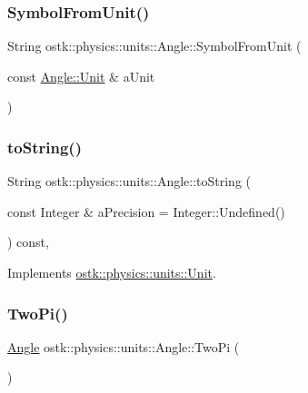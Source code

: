 \subsubsection{\texorpdfstring{Symbol\+From\+Unit()}{SymbolFromUnit()}}
{\footnotesize\ttfamily String ostk\+::physics\+::units\+::\+Angle\+::\+Symbol\+From\+Unit (\begin{DoxyParamCaption}\item[{const \hyperlink{classostk_1_1physics_1_1units_1_1_angle_aea1f8018b1d378b9dee56959d8eb9def}{Angle\+::\+Unit} \&}]{a\+Unit }\end{DoxyParamCaption})\hspace{0.3cm}{\ttfamily [static]}}

\mbox{\label{classostk_1_1physics_1_1units_1_1_angle_a7403146e01d293dfdd30130f9a9f0f2f}} 
\subsubsection{\texorpdfstring{to\+String()}{toString()}}
{\footnotesize\ttfamily String ostk\+::physics\+::units\+::\+Angle\+::to\+String (\begin{DoxyParamCaption}\item[{const Integer \&}]{a\+Precision = {\ttfamily Integer\+:\+:Undefined()} }\end{DoxyParamCaption}) const\hspace{0.3cm}{\ttfamily [override]}, {\ttfamily [virtual]}}



Implements \hyperlink{classostk_1_1physics_1_1units_1_1_unit_a8162b4eb8221c7577af16ab8b399d07e}{ostk\+::physics\+::units\+::\+Unit}.

\mbox{\label{classostk_1_1physics_1_1units_1_1_angle_a2a78cc568975aa82e2011e24cd015f72}} 
\subsubsection{\texorpdfstring{Two\+Pi()}{TwoPi()}}
{\footnotesize\ttfamily \hyperlink{classostk_1_1physics_1_1units_1_1_angle}{Angle} ostk\+::physics\+::units\+::\+Angle\+::\+Two\+Pi (\begin{DoxyParamCaption}{ }\end{DoxyParamCaption})\hspace{0.3cm}{\ttfamily [static]}}

